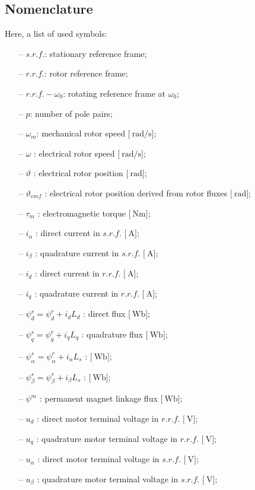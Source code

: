 \documentclass[11pt,a4paper,oneside]{book}
\numberwithin{equation}{section}
\theoremstyle{it}
\theoremstyle{definition}
\begin{document}
\subsection{Nomenclature}	
Here, a list of used symbols:
\begin{itemize}
	\item[--] $s.r.f.$: stationary reference frame;
	\item[--] $r.r.f.$: rotor reference frame;
	\item[--] $r.r.f.-\omega_0$: rotating reference frame at $\omega_0$;	
	\item[--] $p$: number of pole pairs;
	\item[--] $\omega_m$: mechanical rotor speed $\Big[\SI{}{\radian\per\second}\Big]$;
	\item[--] $\omega$ : electrical rotor speed $\Big[\SI{}{\radian\per\second}\Big]$;
	\item[--] $\vartheta$ : electrical rotor position $\Big[\SI{}{\radian}\Big]$;
	\item[--] $\vartheta_{emf}$ : electrical rotor position derived from rotor fluxes $\Big[\SI{}{\radian}\Big]$;
	\item[--] $\tau_m$ : electromagnetic torque $\Big[\SI{}{\newton\meter}\Big]$;
	\item[--] $i_\alpha$ : direct current in $s.r.f.$ $\Big[\SI{}{\ampere}\Big]$;
	\item[--] $i_\beta$ : quadrature current in $s.r.f.$ $\Big[\SI{}{\ampere}\Big]$;
	\item[--] $i_d$ : direct current in $r.r.f.$ $\Big[\SI{}{\ampere}\Big]$;
	\item[--] $i_q$ : quadrature current in $r.r.f.$ $\Big[\SI{}{\ampere}\Big]$;
	\item[--] $\psi_d^s=\psi_d^r+i_dL_d$ : direct flux $\Big[\SI{}{\weber}\Big]$;	
	\item[--] $\psi_q^s=\psi_q^r+i_qL_q$ : quadrature flux $\Big[\SI{}{\weber}\Big]$;	
	\item[--] $\psi_{\alpha}^s=\psi_{\alpha}^r+i_{\alpha}L_{s}$ : $\Big[\SI{}{\weber}\Big]$;	
	\item[--] $\psi_{\beta}^s=\psi_{\beta}^r+i_{\beta}L_{s}$ : $\Big[\SI{}{\weber}\Big]$;		
	\item[--] $\psi^m$ : permanent magnet linkage flux $\Big[\SI{}{\weber}\Big]$;		
	\item[--] $u_d$ : direct motor terminal voltage in $r.r.f.$ $\Big[\SI{}{\volt}\Big]$;
	\item[--] $u_q$ : quadrature motor terminal voltage in $r.r.f.$ $\Big[\SI{}{\volt}\Big]$;
	\item[--] $u_\alpha$ : direct motor terminal voltage in $s.r.f.$ $\Big[\SI{}{\volt}\Big]$;
	\item[--] $u_\beta$ : quadrature motor terminal voltage in $s.r.f.$ $\Big[\SI{}{\volt}\Big]$;
\end{itemize}
\end{document}
